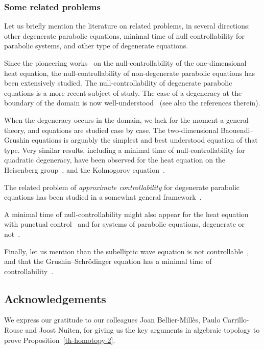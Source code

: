 \documentclass[10pt]{amsart}
\theoremstyle{definition}\newtheorem{defi}[theo]{Definition}\newtheorem{rema}[theo]{Remark}\newtheorem{exam}[theo]{Example}\newtheorem{exem}[theo]{Example}\newtheorem{nota}[theo]{Notation}
\newcommand{\1}{\mathds 1}
\begin{document}
\subsubsection{Some related problems}

Let us briefly mention the literature on related problems, in several directions: other degenerate parabolic equations, minimal time of null controllability for parabolic systems, and other type of degenerate equations.

Since the pioneering works~\cite{FR71,Egorov63} on the null-controllability of the one-dimensional heat equation, the null-controllability of non-degenerate parabolic equations has been extensively studied. The null-controllability of degenerate parabolic equations is a more recent subject of study. The case of a degeneracy at the boundary of the domain is now well-understood~\cite{CMV16} (see also the references therein).

When the degeneracy occurs in the domain, we lack for the moment a general theory, and equations are studied case by case. The two-dimensional Baouendi--Grushin equations is arguably the simplest and best understood equation of that type. Very similar results, including a minimal time of null-controllability for quadratic degeneracy, have been observed for the heat equation on the Heisenberg group~\cite{BC17,BDE20}, and the Kolmogorov equation~\cite{Beauchard14,BHHR15,BZ09,
DR21,Koenig20}.

The related problem of \emph{approximate controllability} for degenerate parabolic equations has been studied in a somewhat general framework~\cite{LL22}.

A minimal time of null-controllability might also appear for the heat equation with punctual control~\cite{Dolecki73} and for systems of parabolic equations, degenerate or not~\cite{ABGd16,BBM20}.

Finally, let us mention than the subelliptic wave equation is not controllable~\cite{Letrouit23}, and that the Grushin--Schr\"odinger equation has a minimal time of controllability~\cite{BS22,FL21,LS23}.

\subsection*{Acknowledgements}

We express our gratitude to our colleagues Joan Bellier-Millès, Paulo Carrillo-Rouse and Joost Nuiten, for giving us the key arguments in algebraic topology to prove Proposition~\ref{th-homotopy-2}.
 
\end{document}
